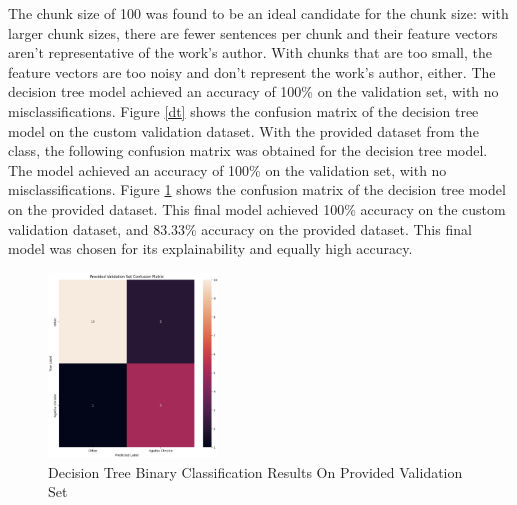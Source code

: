 \documentclass[journal]{IEEEtran} %
\begin{document}
The chunk size of 100 was found to be an ideal candidate for the chunk size: with larger chunk sizes, there are fewer sentences per chunk and their feature vectors aren't representative of the work's author. With chunks that are too small, the feature vectors are too noisy and don't represent the work's author, either. The decision tree model achieved an accuracy of 100\% on the validation set, with no misclassifications. Figure \ref{dt} shows the confusion matrix of the decision tree model on the custom validation dataset.
With the provided dataset from the class, the following confusion matrix was obtained for the decision tree model. The model achieved an accuracy of 100\% on the validation set, with no misclassifications. Figure \ref{dt2} shows the confusion matrix of the decision tree model on the provided dataset. This final model achieved 100\% accuracy on the custom validation dataset, and 83.33\% accuracy on the provided dataset.
This final model was chosen for its explainability and equally high accuracy.

\begin{figure}
    \caption{Decision Tree Binary Classification Results On Provided Validation Set}
    \begin{center}
    \centerline{\includegraphics[width=0.4\textwidth]{./dt2.png}}
    \end{center}
    \centering
    \label{dt2}
\end{figure}
\end{document}

